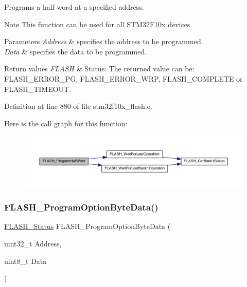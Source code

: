 Programs a half word at a specified address. 

\begin{DoxyNote}{Note}
This function can be used for all S\+T\+M32\+F10x devices. 
\end{DoxyNote}

\begin{DoxyParams}{Parameters}
{\em Address} & specifies the address to be programmed. \\
\hline
{\em Data} & specifies the data to be programmed. \\
\hline
\end{DoxyParams}

\begin{DoxyRetVals}{Return values}
{\em F\+L\+A\+SH} & Status\+: The returned value can be\+: F\+L\+A\+S\+H\+\_\+\+E\+R\+R\+O\+R\+\_\+\+PG, F\+L\+A\+S\+H\+\_\+\+E\+R\+R\+O\+R\+\_\+\+W\+RP, F\+L\+A\+S\+H\+\_\+\+C\+O\+M\+P\+L\+E\+TE or F\+L\+A\+S\+H\+\_\+\+T\+I\+M\+E\+O\+UT. \\
\hline
\end{DoxyRetVals}


Definition at line 880 of file stm32f10x\+\_\+flash.\+c.

Here is the call graph for this function\+:
\nopagebreak
\begin{figure}[H]
\begin{center}
\leavevmode
\includegraphics[width=350pt]{group___f_l_a_s_h___exported___functions_ga5c1336f667950a8765887228f1d0d501_cgraph}
\end{center}
\end{figure}
\mbox{\label{group___f_l_a_s_h___exported___functions_ga1382ff9d4ded8a5c076fde4fff529d21}} 
\subsubsection{\texorpdfstring{F\+L\+A\+S\+H\+\_\+\+Program\+Option\+Byte\+Data()}{FLASH\_ProgramOptionByteData()}}
{\footnotesize\ttfamily \hyperlink{group___f_l_a_s_h___exported___types_gadc63a6f3404ff1f71229a66915e9cdc0}{F\+L\+A\+S\+H\+\_\+\+Status} F\+L\+A\+S\+H\+\_\+\+Program\+Option\+Byte\+Data (\begin{DoxyParamCaption}\item[{uint32\+\_\+t}]{Address,  }\item[{uint8\+\_\+t}]{Data }\end{DoxyParamCaption})}



